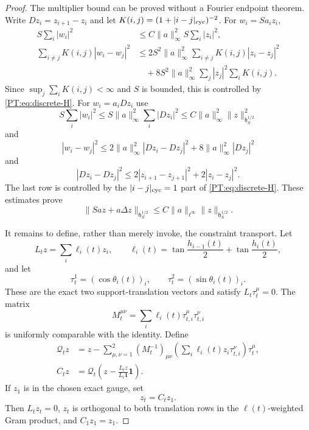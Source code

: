 \documentclass[11pt]{amsart}
\numberwithin{equation}{section}
\theoremstyle{definition}
\theoremstyle{remark}
\begin{document}
\begin{proof}
The multiplier bound can be proved without a Fourier endpoint theorem.
Write $Dz_i=z_{i+1}-z_i$ and let $K(i,j)=(1+|i-j|_{\rm cyc})^{-2}$.
For $w_i=Sa_iz_i$,
\begin{align*}
 S\sum_i|w_i|^2&\le C\|a\|_\infty^2S\sum_i|z_i|^2,\\
 \sum_{i\ne j}K(i,j)|w_i-w_j|^2
 &\le2S^2\|a\|_\infty^2
      \sum_{i\ne j}K(i,j)|z_i-z_j|^2\\
 &\quad+8S^2\|a\|_\infty^2
      \sum_j|z_j|^2\sum_iK(i,j).
\end{align*}
Since $\sup_j\sum_iK(i,j)<\infty$ and $S$ is bounded, this is controlled
by \eqref{PT:eq:discrete-H}.  For $w_i=a_iDz_i$ use
\[
 S\sum_i|w_i|^2
 \le S\|a\|_\infty^2\sum_i|Dz_i|^2
 \le C\|a\|_\infty^2\|z\|_{\mathfrak h^{1/2}_S}^2
\]
and
\[
 |w_i-w_j|^2
 \le2\|a\|_\infty^2|Dz_i-Dz_j|^2
     +8\|a\|_\infty^2|Dz_j|^2
\]
and
\[
 |Dz_i-Dz_j|^2
 \le2|z_{i+1}-z_{j+1}|^2+2|z_i-z_j|^2.
\]
The last row is controlled by the $|i-j|_{\rm cyc}=1$ part of
\eqref{PT:eq:discrete-H}.  These estimates prove
\begin{equation}\label{PT:eq:ledger-bound}
 \|Sa z+a\Delta z\|_{\mathfrak h^{1/2}_S}
 \le C\|a\|_{\ell^\infty}
       \|z\|_{\mathfrak h^{1/2}_S}.
\end{equation}

It remains to define, rather than merely invoke, the constraint
transport.  Let
\begin{equation}\label{PT:eq:area-row}
 L_tz=\sum_i\ell_i(t)z_i,\qquad
 \ell_i(t)=\tan\frac{h_{i-1}(t)}2+\tan\frac{h_i(t)}2,
\end{equation}
and let
\[
 \tau_t^1=(\cos\theta_i(t))_i,\qquad
 \tau_t^2=(\sin\theta_i(t))_i.
\]
These are the exact two support-translation vectors and satisfy
$L_t\tau_t^\mu=0$.  The matrix
\begin{equation}\label{PT:eq:translation-Gram}
 M_t^{\mu\nu}=\sum_i\ell_i(t)\tau_{t,i}^\mu\tau_{t,i}^\nu
\end{equation}
is uniformly comparable with the identity.  Define
\begin{align}
 \mathcal Q_tz
 &=z-\sum_{\mu,\nu=1}^2(M_t^{-1})_{\mu\nu}
 \left(\sum_i\ell_i(t)z_i\tau_{t,i}^\nu\right)\tau_t^\mu,
 \label{PT:eq:translation-projection}\\
 C_tz
 &=\mathcal Q_t\left(z-\frac{L_tz}{L_t\mathbf1}\mathbf1\right).
 \label{PT:eq:constraint-transport}
\end{align}
If $z_1$ is in the chosen exact gauge, set
\begin{equation}\label{PT:eq:z-transport}
 z_t=C_tz_1.
\end{equation}
Then $L_tz_t=0$, $z_t$ is orthogonal to both translation rows in the
$\ell(t)$-weighted Gram product, and $C_1z_1=z_1$.


\end{proof}
\end{document}
